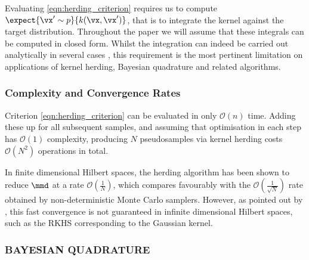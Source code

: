 Evaluating \eqref{eqn:herding_criterion} requires us to compute $\expect{\vx' \sim p}{k(\vx, \vx')} $, that is to integrate the kernel against the target distribution. Throughout the paper we will assume that these integrals can be computed in closed form. Whilst the integration can indeed be carried out analytically in several cases \citep{Song2008,chen2010super}, this requirement is the most pertinent limitation on applications of kernel herding, Bayesian quadrature and related algorithms.

\subsubsection{Complexity and Convergence Rates}

Criterion \eqref{eqn:herding_criterion} can be evaluated in only $\mathcal{O}(n)$ time. Adding these up for all subsequent samples, and assuming that optimisation in each step has $\mathcal{O}(1)$ complexity, producing $N$ pseudosamples via kernel herding costs $\mathcal{O}(N^2)$ operations in total.

In finite dimensional Hilbert spaces, the herding algorithm has been shown to reduce $\mmd$ at a rate $\mathcal{O}(\frac{1}{N})$, which compares favourably with the $\mathcal{O}(\frac{1}{\sqrt{N}})$ rate obtained by non-deterministic Monte Carlo samplers. However, as pointed out by \citep{bach2012equivalence}, this fast convergence is not guaranteed in infinite dimensional Hilbert spaces, such as the RKHS corresponding to the Gaussian kernel.




\subsubsection{BAYESIAN QUADRATURE} 

